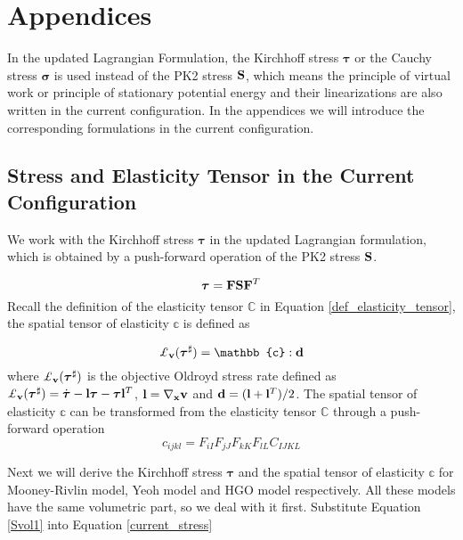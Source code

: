 \section{Appendices}
In the updated Lagrangian Formulation, the Kirchhoff stress $\boldsymbol{\tau}$ or the Cauchy stress $\boldsymbol{\sigma}$ is used instead of the PK2 stress $\bold{S}$, which means the principle of virtual work or principle of stationary potential energy and their linearizations are also written in the current configuration. In the appendices we will introduce the corresponding formulations in the current configuration.

%
\subsection{Stress and Elasticity Tensor in the Current Configuration}
We work with the Kirchhoff stress $\boldsymbol{\tau}$ in the updated Lagrangian formulation, which is obtained by a push-forward operation of the PK2 stress $\bold{S}$.

\begin{equation}
\boldsymbol{\tau} = \bold{F}\bold{S}{\bold{F}}^T \label{current_stress}
\end{equation}
Recall the definition of the elasticity tensor $\mathbb{C}$ in Equation \ref{def_elasticity_tensor}, the spatial tensor of elasticity $\mathbb{c}$ is defined as

\begin{equation}
\pounds_{\bold{v}}({\boldsymbol{\tau}}^{\sharp}) = \mathbb{c} : \bold{d}
\end{equation} 
where $\pounds_{\bold{v}}({\boldsymbol{\tau}}^{\sharp})$ is the objective Oldroyd stress rate defined as $\pounds_{\bold{v}}({\boldsymbol{\tau}}^{\sharp}) = \dot{\boldsymbol{\tau}} - \bold{l}\boldsymbol{\tau} - \boldsymbol{\tau}\bold{l}^T$, $\bold{l} = \nabla_{\bold{x}}\bold{v}$ and $\bold{d} = (\bold{l} + {\bold{l}}^T)/2$. 
The spatial tensor of elasticity $\mathbb{c}$ can be transformed from the elasticity tensor $\mathbb{C}$ through a push-forward operation
\begin{equation}
c_{ijkl} = F_{iI}F_{jJ}F_{kK}F_{lL}C_{IJKL} \label{current_elasticity}
\end{equation}

Next we will derive the Kirchhoff stress $\boldsymbol{\tau}$ and the spatial tensor of elasticity $\mathbb{c}$ for Mooney-Rivlin model, Yeoh model and HGO model respectively. All these models have the same volumetric part, so we deal with it first. Substitute Equation \ref{Svol1} into Equation \ref{current_stress}

